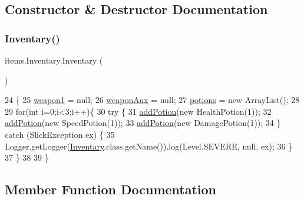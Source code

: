 \subsection{Constructor \& Destructor Documentation}
\mbox{\label{classitems_1_1_inventary_a375b341c9d44109ab5170722c5a614ee}} 
\subsubsection{\texorpdfstring{Inventary()}{Inventary()}}
{\footnotesize\ttfamily items.\+Inventary.\+Inventary (\begin{DoxyParamCaption}{ }\end{DoxyParamCaption})\hspace{0.3cm}{\ttfamily [inline]}}


\begin{DoxyCode}
24                        \{
25         \mbox{\hyperlink{classitems_1_1_inventary_ad16ddfb714d749294e1fe64841ca9074}{weapon1}} = null;
26         \mbox{\hyperlink{classitems_1_1_inventary_a1f8cf512e097112b449136da9c6670b7}{weaponAux}} = null;
27         \mbox{\hyperlink{classitems_1_1_inventary_afa542455e08a2cc05377133889b7b091}{potions}} = \textcolor{keyword}{new} ArrayList();
28         
29         \textcolor{keywordflow}{for}(\textcolor{keywordtype}{int} i=0;i<3;i++)\{
30             \textcolor{keywordflow}{try} \{
31                 \mbox{\hyperlink{classitems_1_1_inventary_ab729ee27d843b475311e4738a39782cf}{addPotion}}(\textcolor{keyword}{new} HealthPotion(1));
32                 \mbox{\hyperlink{classitems_1_1_inventary_ab729ee27d843b475311e4738a39782cf}{addPotion}}(\textcolor{keyword}{new} SpeedPotion(1));
33                 \mbox{\hyperlink{classitems_1_1_inventary_ab729ee27d843b475311e4738a39782cf}{addPotion}}(\textcolor{keyword}{new} DamagePotion(1));
34             \} \textcolor{keywordflow}{catch} (SlickException ex) \{
35                 Logger.getLogger(\mbox{\hyperlink{classitems_1_1_inventary_a375b341c9d44109ab5170722c5a614ee}{Inventary}}.class.getName()).log(Level.SEVERE, null, ex);
36             \}
37         \}
38 
39     \}
\end{DoxyCode}


\subsection{Member Function Documentation}
\mbox{\label{classitems_1_1_inventary_ab729ee27d843b475311e4738a39782cf}} 
